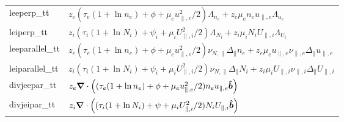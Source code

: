 \begin{longtable}{ll}
    leeperp\_tt &$z_e(\tau_e(1+\ln n_e) + \phi + \mu_eu_{\parallel,e}^2/2) \Lambda_{n_e} + z_e\mu_e n_e u_{\parallel,e} \Lambda_{u_e}$ \\
    leiperp\_tt &$z_i(\tau_i(1+\ln N_i) + \psi_i + \mu_iU_{\parallel,i}^2/2) \Lambda_{N_i} + z_i\mu_i N_i U_{\parallel,i} \Lambda_{U_i}$ \\
    leeparallel\_tt & $z_e(\tau_e(1+\ln n_e) + \phi + \mu_eu_{\parallel,e}^2/2) \nu_{N,\parallel} \Delta_\parallel n_e +
                         z_e\mu_e u_{\parallel,e} \nu_{\parallel,e} \Delta_\parallel u_{\parallel,e}$ \\
    leiparallel\_tt & $z_i(\tau_i(1+\ln N_i) + \psi_i + \mu_iU_{\parallel,i}^2/2) \nu_{N,\parallel} \Delta_\parallel N_i +
                         z_i\mu_i U_{\parallel,i} \nu_{\parallel,i} \Delta_\parallel U_{\parallel,i}$ \\
    divjeepar\_tt &$ z_e{\boldsymbol{\nabla}}\cdot \left( (\tau_e(1+\ln n_e) + \phi + \mu_eu_{\parallel,e}^2/2) n_eu_{\parallel,e}\bm{\hat{b}}\right)$ \\
    divjeipar\_tt &$ z_i{\boldsymbol{\nabla}}\cdot \left( (\tau_i(1+\ln N_i) + \psi + \mu_iU_{\parallel,i}^2/2) N_iU_{\parallel,i}\bm{\hat{b}}\right)$ \\
\bottomrule
\end{longtable}

